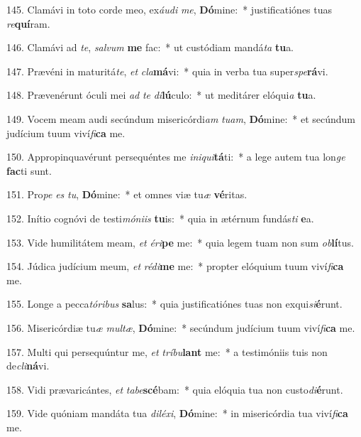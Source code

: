 145. Clamávi in toto corde meo, ex\textit{áu}\textit{di} \textit{me}, \textbf{Dó}mine:~*  justificatiónes tuas \textit{re}\textbf{quí}ram.\

146. Clamávi ad \textit{te}, \textit{sal}\textit{vum} \textbf{me} fac:~*  ut custódiam mandá\textit{ta} \textbf{tu}a.\

147. Prævéni in maturitá\textit{te}, \textit{et} \textit{cla}\textbf{má}vi:~*  quia in verba tua super\textit{spe}\textbf{rá}vi.\

148. Prævenérunt óculi mei \textit{ad} \textit{te} \textit{di}\textbf{lú}culo:~*  ut meditárer elóqui\textit{a} \textbf{tu}a.\

149. Vocem meam audi secúndum misericórdi\textit{am} \textit{tu}\textit{am}, \textbf{Dó}mine:~*  et secúndum judícium tuum viví\textit{fi}\textbf{ca} me.\

150. Appropinquavérunt persequéntes me \textit{in}\textit{i}\textit{qui}\textbf{tá}ti:~*  a lege autem tua lon\textit{ge} \textbf{fac}ti sunt.\

151. Pro\textit{pe} \textit{es} \textit{tu}, \textbf{Dó}mine:~*  et omnes viæ tu\textit{æ} \textbf{vé}ritas.\

152. Inítio cognóvi de testi\textit{mó}\textit{ni}\textit{is} \textbf{tu}is:~*  quia in ætérnum fundás\textit{ti} \textbf{e}a.\

153. Vide humilitátem meam, \textit{et} \textit{é}\textit{ri}\textbf{pe} me:~*  quia legem tuam non sum \textit{ob}\textbf{lí}tus.\

154. Júdica judícium meum, \textit{et} \textit{réd}\textit{i}\textbf{me} me:~*  propter elóquium tuum viví\textit{fi}\textbf{ca} me.\

155. Longe a pecca\textit{tó}\textit{ri}\textit{bus} \textbf{sa}lus:~*  quia justificatiónes tuas non exqui\textit{si}\textbf{é}runt.\

156. Misericórdiæ tu\textit{æ} \textit{mul}\textit{tæ}, \textbf{Dó}mine:~*  secúndum judícium tuum viví\textit{fi}\textbf{ca} me.\

157. Multi qui persequúntur me, \textit{et} \textit{trí}\textit{bu}\textbf{lant} me:~*  a testimóniis tuis non de\textit{cli}\textbf{ná}vi.\

158. Vidi prævaricántes, \textit{et} \textit{ta}\textit{be}\textbf{scé}bam:~*  quia elóquia tua non custo\textit{di}\textbf{é}runt.\

159. Vide quóniam mandáta tua \textit{di}\textit{lé}\textit{xi}, \textbf{Dó}mine:~*  in misericórdia tua viví\textit{fi}\textbf{ca} me.\

